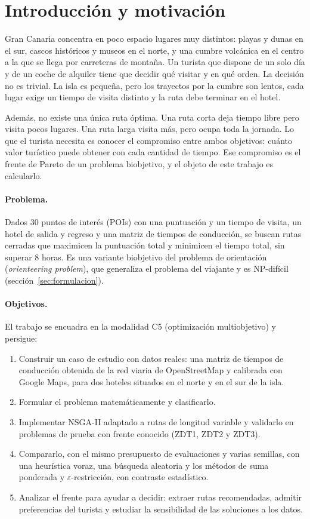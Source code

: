 \section{Introducción y motivación}
\label{sec:introduccion}

Gran Canaria concentra en poco espacio lugares muy distintos: playas y dunas en el sur, cascos históricos y museos en el norte, y una cumbre volcánica en el centro a la que se llega por carreteras de montaña. Un turista que dispone de un solo día y de un coche de alquiler tiene que decidir qué visitar y en qué orden. La decisión no es trivial. La isla es pequeña, pero los trayectos por la cumbre son lentos, cada lugar exige un tiempo de visita distinto y la ruta debe terminar en el hotel.

Además, no existe una única ruta óptima. Una ruta corta deja tiempo libre pero visita pocos lugares. Una ruta larga visita más, pero ocupa toda la jornada. Lo que el turista necesita es conocer el compromiso entre ambos objetivos: cuánto valor turístico puede obtener con cada cantidad de tiempo. Ese compromiso es el frente de Pareto de un problema biobjetivo, y el objeto de este trabajo es calcularlo.

\paragraph{Problema.} Dados 30 puntos de interés (POIs) con una puntuación y un tiempo de visita, un hotel de salida y regreso y una matriz de tiempos de conducción, se buscan rutas cerradas que maximicen la puntuación total y minimicen el tiempo total, sin superar 8 horas. Es una variante biobjetivo del problema de orientación (\emph{orienteering problem}), que generaliza el problema del viajante y es NP-difícil (sección~\ref{sec:formulacion}).

\paragraph{Objetivos.} El trabajo se encuadra en la modalidad C5 (optimización multiobjetivo) y persigue:
\begin{enumerate}
  \item Construir un caso de estudio con datos reales: una matriz de tiempos de conducción obtenida de la red viaria de OpenStreetMap y calibrada con Google Maps, para dos hoteles situados en el norte y en el sur de la isla.
  \item Formular el problema matemáticamente y clasificarlo.
  \item Implementar NSGA-II adaptado a rutas de longitud variable y validarlo en problemas de prueba con frente conocido (ZDT1, ZDT2 y ZDT3).
  \item Compararlo, con el mismo presupuesto de evaluaciones y varias semillas, con una heurística voraz, una búsqueda aleatoria y los métodos de suma ponderada y $\varepsilon$-restricción, con contraste estadístico.
  \item Analizar el frente para ayudar a decidir: extraer rutas recomendadas, admitir preferencias del turista y estudiar la sensibilidad de las soluciones a los datos.
\end{enumerate}

